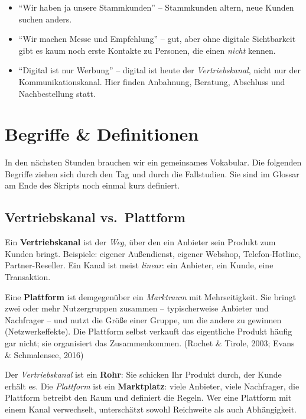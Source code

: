 \documentclass[11pt,a4paper,oneside]{article}
\newcommand{\fachbegriff}[1]{\textbf{#1}}
\newcommand{\quelle}[1]{{\footnotesize\color{lpGray}(#1)}}
\begin{document}
\begin{itemize}
  \item ``Wir haben ja unsere Stammkunden'' -- Stammkunden altern, neue Kunden suchen anders.
  \item ``Wir machen Messe und Empfehlung'' -- gut, aber ohne digitale Sichtbarkeit gibt es kaum noch erste Kontakte zu Personen, die einen \emph{nicht} kennen.
  \item ``Digital ist nur Werbung'' -- digital ist heute der \emph{Vertriebskanal}, nicht nur der Kommunikationskanal. Hier finden Anbahnung, Beratung, Abschluss und Nachbestellung statt.
\end{itemize}

\section{Begriffe \& Definitionen}

In den nächsten Stunden brauchen wir ein gemeinsames Vokabular. Die folgenden Begriffe ziehen sich durch den Tag und durch die Fallstudien. Sie sind im Glossar am Ende des Skripts noch einmal kurz definiert.

\subsection{Vertriebskanal vs.\ Plattform}

Ein \fachbegriff{Vertriebskanal} ist der \emph{Weg}, über den ein Anbieter sein Produkt zum Kunden bringt. Beispiele: eigener Außendienst, eigener Webshop, Telefon-Hotline, Partner-Reseller. Ein Kanal ist meist \emph{linear}: ein Anbieter, ein Kunde, eine Transaktion.

Eine \fachbegriff{Plattform} ist demgegenüber ein \emph{Marktraum} mit Mehrseitigkeit. Sie bringt zwei oder mehr Nutzergruppen zusammen -- typischerweise Anbieter und Nachfrager -- und nutzt die Größe einer Gruppe, um die andere zu gewinnen (Netzwerkeffekte). Die Plattform selbst verkauft das eigentliche Produkt häufig gar nicht; sie organisiert das Zusammenkommen. \quelle{Rochet \& Tirole, 2003; Evans \& Schmalensee, 2016}

\begin{merkbox}[Kernunterschied]
Der \emph{Vertriebskanal} ist ein \textbf{Rohr}: Sie schicken Ihr Produkt durch, der Kunde erhält es. Die \emph{Plattform} ist ein \textbf{Marktplatz}: viele Anbieter, viele Nachfrager, die Plattform betreibt den Raum und definiert die Regeln. Wer eine Plattform mit einem Kanal verwechselt, unterschätzt sowohl Reichweite als auch Abhängigkeit.
\end{merkbox}
\end{document}

